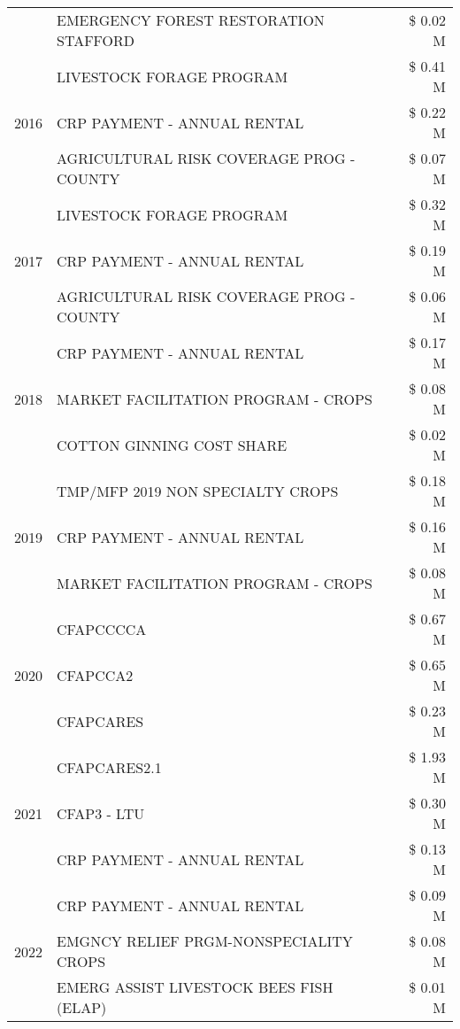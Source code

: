 \begin{tabular}{llr}
 & EMERGENCY FOREST RESTORATION STAFFORD & \$ 0.02 M \\
\cline{1-3}
\multirow[t]{3}{*}{2016} & LIVESTOCK FORAGE PROGRAM & \$ 0.41 M \\
 & CRP PAYMENT - ANNUAL RENTAL & \$ 0.22 M \\
 & AGRICULTURAL RISK COVERAGE PROG - COUNTY & \$ 0.07 M \\
\cline{1-3}
\multirow[t]{3}{*}{2017} & LIVESTOCK FORAGE PROGRAM & \$ 0.32 M \\
 & CRP PAYMENT - ANNUAL RENTAL & \$ 0.19 M \\
 & AGRICULTURAL RISK COVERAGE PROG - COUNTY & \$ 0.06 M \\
\cline{1-3}
\multirow[t]{3}{*}{2018} & CRP PAYMENT - ANNUAL RENTAL & \$ 0.17 M \\
 & MARKET FACILITATION PROGRAM - CROPS & \$ 0.08 M \\
 & COTTON GINNING COST SHARE & \$ 0.02 M \\
\cline{1-3}
\multirow[t]{3}{*}{2019} & TMP/MFP 2019 NON SPECIALTY CROPS & \$ 0.18 M \\
 & CRP PAYMENT - ANNUAL RENTAL & \$ 0.16 M \\
 & MARKET FACILITATION PROGRAM - CROPS & \$ 0.08 M \\
\cline{1-3}
\multirow[t]{3}{*}{2020} & CFAPCCCCA & \$ 0.67 M \\
 & CFAPCCA2 & \$ 0.65 M \\
 & CFAPCARES & \$ 0.23 M \\
\cline{1-3}
\multirow[t]{3}{*}{2021} & CFAPCARES2.1 & \$ 1.93 M \\
 & CFAP3 - LTU & \$ 0.30 M \\
 & CRP PAYMENT - ANNUAL RENTAL & \$ 0.13 M \\
\cline{1-3}
\multirow[t]{3}{*}{2022} & CRP PAYMENT - ANNUAL RENTAL & \$ 0.09 M \\
 & EMGNCY RELIEF PRGM-NONSPECIALITY CROPS & \$ 0.08 M \\
 & EMERG ASSIST LIVESTOCK BEES FISH (ELAP) & \$ 0.01 M \\
\cline{1-3}
\bottomrule
\end{tabular}
